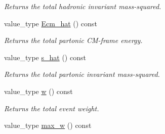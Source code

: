 \begin{DoxyCompactItemize}
\begin{DoxyCompactList}\small\item\em Returns the total hadronic invariant mass-\/squared. \end{DoxyCompactList}\item 
\hypertarget{a00441_a19143c958a21b0c29eabfdabb086181a}{value\-\_\-type \hyperlink{a00441_a19143c958a21b0c29eabfdabb086181a}{Ecm\-\_\-hat} () const }\label{a00441_a19143c958a21b0c29eabfdabb086181a}

\begin{DoxyCompactList}\small\item\em Returns the total partonic C\-M-\/frame energy. \end{DoxyCompactList}\item 
\hypertarget{a00441_aefbfe8858098c6dabea063631f206864}{value\-\_\-type \hyperlink{a00441_aefbfe8858098c6dabea063631f206864}{s\-\_\-hat} () const }\label{a00441_aefbfe8858098c6dabea063631f206864}

\begin{DoxyCompactList}\small\item\em Returns the total partonic invariant mass-\/squared. \end{DoxyCompactList}\item 
\hypertarget{a00441_a7129e1370ce585ae74defff94878d680}{value\-\_\-type \hyperlink{a00441_a7129e1370ce585ae74defff94878d680}{w} () const }\label{a00441_a7129e1370ce585ae74defff94878d680}

\begin{DoxyCompactList}\small\item\em Returns the total event weight. \end{DoxyCompactList}\item 
\hypertarget{a00441_a1d5f904414f9b7a2d505b0e1a434650c}{value\-\_\-type \hyperlink{a00441_a1d5f904414f9b7a2d505b0e1a434650c}{max\-\_\-w} () const }\label{a00441_a1d5f904414f9b7a2d505b0e1a434650c}


\end{DoxyCompactItemize}
